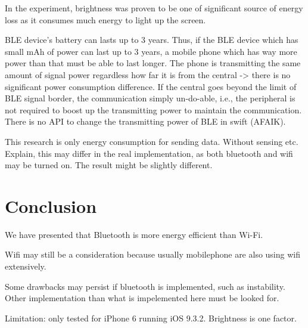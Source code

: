 \documentclass[journal]{vgtc}                %
\begin{document}
In the experiment, brightness was proven to be one of significant source of energy loss as it consumes much energy to light up the screen.

BLE device's battery can lasts up to 3 years. Thus, if the BLE device which has small mAh of power can last up to 3 years, a mobile phone which has way more power than that must be able to last longer.
The phone is transmitting the same amount of signal power regardless how far it is from the central -> there is no significant power consumption difference. If the central goes beyond the limit of BLE signal border, the communication simply un-do-able, i.e., the peripheral is not required to boost up the transmitting power to maintain the communication.
There is no API to change the transmitting power of BLE in swift (AFAIK).

This research is only energy consumption for sending data. Without sensing etc.
Explain, this may differ in the real implementation, as both bluetooth and wifi may be turned on. The result might be slightly different.


\section{Conclusion} %
\label{sec:conclusion}
We have presented that Bluetooth is more energy efficient than Wi-Fi.

Wifi may still be a consideration because usually mobilephone are also using wifi extensively.

Some drawbacks may persist if bluetooth is implemented, such as instability. Other implementation than what is impelemented here must be looked for.

Limitation: only tested for iPhone 6 running iOS 9.3.2.
Brightness is one factor.





\end{document}
